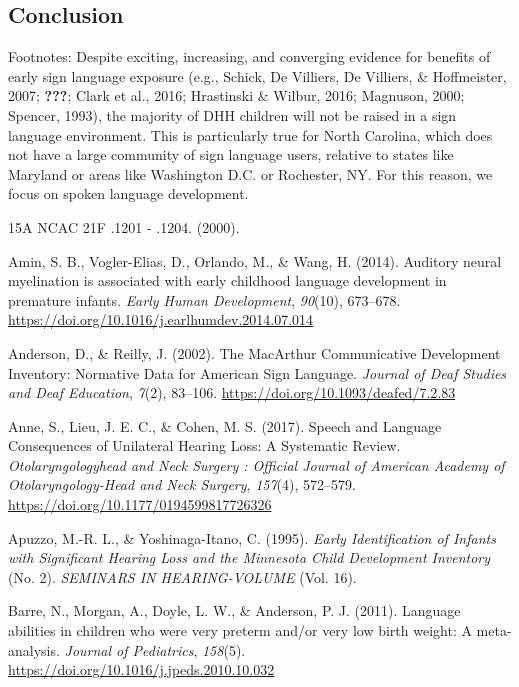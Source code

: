 \documentclass[english,man,floatsintext]{apa6}
\begin{document}
\hypertarget{conclusion}{%
\subsection{Conclusion}\label{conclusion}}

Footnotes: Despite exciting, increasing, and converging evidence for benefits of early sign language exposure (e.g., Schick, De Villiers, De Villiers, \& Hoffmeister, 2007; {\textbf{???}}; Clark et al., 2016; Hrastinski \& Wilbur, 2016; Magnuson, 2000; Spencer, 1993), the majority of DHH children will not be raised in a sign language environment. This is particularly true for North Carolina, which does not have a large community of sign language users, relative to states like Maryland or areas like Washington D.C. or Rochester, NY. For this reason, we focus on spoken language development.

\hypertarget{refs}{}
\leavevmode\hypertarget{ref-2000}{}%
15A NCAC 21F .1201 - .1204. (2000).

\leavevmode\hypertarget{ref-amin2014}{}%
Amin, S. B., Vogler-Elias, D., Orlando, M., \& Wang, H. (2014). Auditory neural myelination is associated with early childhood language development in premature infants. \emph{Early Human Development}, \emph{90}(10), 673--678. \url{https://doi.org/10.1016/j.earlhumdev.2014.07.014}

\leavevmode\hypertarget{ref-anderson2002}{}%
Anderson, D., \& Reilly, J. (2002). The MacArthur Communicative Development Inventory: Normative Data for American Sign Language. \emph{Journal of Deaf Studies and Deaf Education}, \emph{7}(2), 83--106. \url{https://doi.org/10.1093/deafed/7.2.83}

\leavevmode\hypertarget{ref-anne2017}{}%
Anne, S., Lieu, J. E. C., \& Cohen, M. S. (2017). Speech and Language Consequences of Unilateral Hearing Loss: A Systematic Review. \emph{Otolaryngologyhead and Neck Surgery : Official Journal of American Academy of Otolaryngology-Head and Neck Surgery}, \emph{157}(4), 572--579. \url{https://doi.org/10.1177/0194599817726326}

\leavevmode\hypertarget{ref-apuzzo1995}{}%
Apuzzo, M.-R. L., \& Yoshinaga-Itano, C. (1995). \emph{Early Identification of Infants with Significant Hearing Loss and the Minnesota Child Development Inventory} (No. 2). \emph{SEMINARS IN HEARING-VOLUME} (Vol. 16).

\leavevmode\hypertarget{ref-barre2011}{}%
Barre, N., Morgan, A., Doyle, L. W., \& Anderson, P. J. (2011). Language abilities in children who were very preterm and/or very low birth weight: A meta-analysis. \emph{Journal of Pediatrics}, \emph{158}(5). \url{https://doi.org/10.1016/j.jpeds.2010.10.032}
\end{document}
